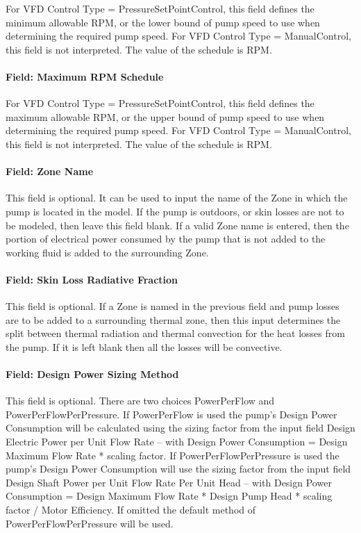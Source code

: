 For VFD Control Type = PressureSetPointControl, this field defines the minimum allowable RPM, or the lower bound of pump speed to use when determining the required pump speed. For VFD Control Type = ManualControl, this field is not interpreted. The value of the schedule is RPM.

\paragraph{Field: Maximum RPM Schedule}\label{field-maximum-rpm-schedule}

For VFD Control Type = PressureSetPointControl, this field defines the maximum allowable RPM, or the upper bound of pump speed to use when determining the required pump speed. For VFD Control Type = ManualControl, this field is not interpreted. The value of the schedule is RPM.

\paragraph{Field: Zone Name}\label{field-zone-name-008}

This field is optional. It can be used to input the name of the Zone in which the pump is located in the model. If the pump is outdoors, or skin losses are not to be modeled, then leave this field blank. If a valid Zone name is entered, then the portion of electrical power consumed by the pump that is not added to the working fluid is added to the surrounding Zone.

\paragraph{Field: Skin Loss Radiative Fraction}\label{field-skin-loss-radiative-fraction-000}

This field is optional. If a Zone is named in the previous field and pump losses are to be added to a surrounding thermal zone, then this input determines the split between thermal radiation and thermal convection for the heat losses from the pump. If it is left blank then all the losses will be convective.

\paragraph{Field: Design Power Sizing Method}\label{field-design-power-sizing-method}

This field is optional. There are two choices PowerPerFlow and PowerPerFlowPerPressure. If PowerPerFlow is used the pump's Design Power Consumption will be calculated using the sizing factor from the input field Design Electric Power per Unit Flow Rate -- with Design Power Consumption = Design Maximum Flow Rate * scaling factor. If PowerPerFlowPerPressure is used the pump's Design Power Consumption will use the sizing factor from the input field Design Shaft Power per Unit Flow Rate Per Unit Head -- with Design Power Consumption = Design Maximum Flow Rate * Design Pump Head * scaling factor / Motor Efficiency. If omitted the default method of PowerPerFlowPerPressure will be used.

